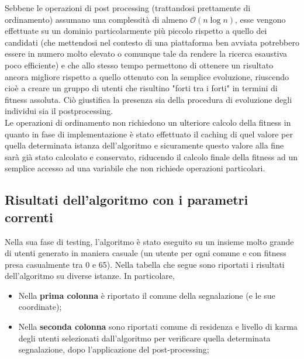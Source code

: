             Sebbene le operazioni di post processing (trattandosi prettamente di ordinamento) assumano una complessità di almeno $\mathcal{O}(n\log{}n)$, esse vengono effettuate su un dominio particolarmente più piccolo rispetto a quello dei candidati (che mettendosi nel contesto di una piattaforma ben avviata potrebbero essere in numero molto elevato o comunque tale da rendere la ricerca esaustiva poco efficiente) e che allo stesso tempo permettono di ottenere un risultato ancora migliore rispetto a quello ottenuto con la semplice evoluzione, riuscendo cioè a creare un gruppo di utenti che risultino "forti tra i forti" in termini di fitness assoluta. Ciò giustifica la presenza sia della procedura di evoluzione degli individui sia il postprocessing. \\ 
            Le operazioni di ordinamento non richiedono un ulteriore calcolo della fitness in quanto in fase di implementazione è stato effettuato il caching di quel valore per quella determinata istanza dell'algoritmo e sicuramente questo valore alla fine sarà già stato calcolato e conservato, riducendo il calcolo finale della fitness ad un semplice accesso ad una variabile che non richiede operazioni particolari.


    \subsection{Risultati dell'algoritmo con i parametri correnti}
        Nella sua fase di testing, l'algoritmo è stato eseguito su un insieme molto grande di utenti generato in maniera casuale (un utente per ogni comune e con fitness presa casualmente tra 0 e 65). Nella tabella che segue sono riportati i risultati dell'algoritmo su diverse istanze. In particolare, 

        \begin{itemize}
            \item Nella \textbf{prima colonna} è riportato il comune della segnalazione (e le sue coordinate);
            \item Nella \textbf{seconda colonna} sono riportati comune di residenza e livello di karma degli utenti selezionati dall'algoritmo  per verificare quella determinata segnalazione, dopo l'applicazione del post-processing;
        \end{itemize}

